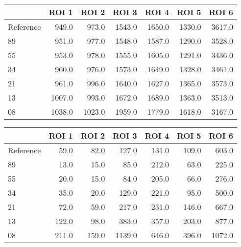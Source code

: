 \begin{tabular}{lrrrrrr}
\toprule
{} &   ROI 1 &   ROI 2 &   ROI 3 &   ROI 4 &   ROI 5 &   ROI 6 \\
\midrule
Reference &   949.0 &   973.0 &  1543.0 &  1650.0 &  1330.0 &  3617.0 \\
89        &   951.0 &   977.0 &  1548.0 &  1587.0 &  1290.0 &  3528.0 \\
55        &   953.0 &   978.0 &  1555.0 &  1605.0 &  1291.0 &  3436.0 \\
34        &   960.0 &   976.0 &  1573.0 &  1649.0 &  1328.0 &  3461.0 \\
21        &   961.0 &   996.0 &  1640.0 &  1627.0 &  1365.0 &  3573.0 \\
13        &  1007.0 &   993.0 &  1672.0 &  1689.0 &  1363.0 &  3513.0 \\
08        &  1038.0 &  1023.0 &  1959.0 &  1779.0 &  1618.0 &  3167.0 \\
\bottomrule
\end{tabular}
\begin{tabular}{lrrrrrr}
\toprule
{} &  ROI 1 &  ROI 2 &   ROI 3 &  ROI 4 &  ROI 5 &   ROI 6 \\
\midrule
Reference &   59.0 &   82.0 &   127.0 &  131.0 &  109.0 &   603.0 \\
89        &   13.0 &   15.0 &    85.0 &  212.0 &   63.0 &   225.0 \\
55        &   20.0 &   15.0 &    84.0 &  205.0 &   66.0 &   276.0 \\
34        &   35.0 &   20.0 &   129.0 &  221.0 &   95.0 &   500.0 \\
21        &   72.0 &   59.0 &   217.0 &  231.0 &  146.0 &   667.0 \\
13        &  122.0 &   98.0 &   383.0 &  357.0 &  203.0 &   877.0 \\
08        &  211.0 &  159.0 &  1139.0 &  646.0 &  396.0 &  1072.0 \\
\bottomrule
\end{tabular}
